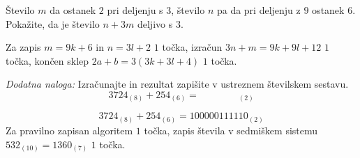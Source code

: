 \documentclass[addpoints]{exam}
\begin{document}
\begin{questions}
    


    \question[3]
    Število $m$ da ostanek $2$ pri deljenju s $3$, število $n$ pa da pri deljenju z $9$ ostanek $6$.
    Pokažite, da je število $n+3m$ deljivo s $3$.
    
    \begin{solution}[3cm]
        Za zapis $m=9k+6$ in $n=3l+2$ $1$ točka, izračun $3n+m=9k+9l+12$ $1$ točka, končen sklep $2a+b=3(3k+3l+4)$ $1$ točka.
    \end{solution}

        




     \newpage

    \bonusquestion[3]
    \textit{Dodatna naloga:} Izračunajte in rezultat zapišite v ustreznem številskem sestavu.
                $$ 3724_{(8)}+ 254_{(6)}= \quad \quad \quad \quad _{(2)} $$

    \begin{solution}[7cm]
        $$ 3724_{(8)}+ 254_{(6)}= 100000111110_{(2)} $$
        Za pravilno zapisan algoritem $1$ točka, zapis števila v sedmiškem sistemu $532_{(10)}=1360_{(7)}$ $1$ točka.
    \end{solution}




\end{questions}
\end{document}

